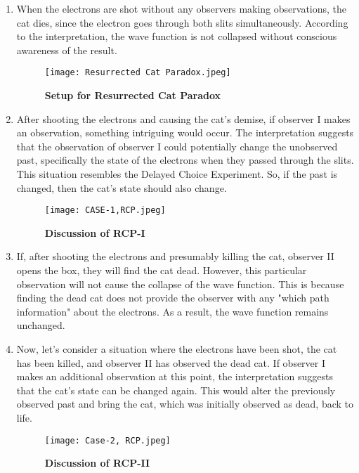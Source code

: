 \documentclass{article}
\begin{document}
\begin{enumerate}
    \item When the electrons are shot without any observers making observations, the cat dies, since the electron goes through both slits simultaneously. According to the interpretation, the wave function is not collapsed without conscious awareness of the result.


\begin{figure}[h]
    \centering 
    \texttt{[image: Resurrected Cat Paradox.jpeg]}
    \caption{\textbf{Setup for Resurrected Cat Paradox}}
    \label{Setup for Resurrected Cat Paradox}
\end{figure}



\item  After shooting the electrons and causing the cat's demise, if observer I makes an observation, something intriguing would occur. The interpretation suggests that the observation of observer I could potentially change the unobserved past, specifically the state of the electrons when they passed through the slits. This situation resembles the Delayed Choice Experiment. So, if the past is changed, then the cat's state should also change.


\begin{figure}[h]
\centering
     \texttt{[image: CASE-1,RCP.jpeg]}
      \caption{\textbf{Discussion of RCP-I}}
       \label{}
\end{figure}

\item If, after shooting the electrons and presumably killing the cat, observer II opens the box, they will find the cat dead. However, this particular observation will not cause the collapse of the wave function. This is because finding the dead cat does not provide the observer with any "which path information" about the electrons. As a result, the wave function remains unchanged.

\item Now, let's consider a situation where the electrons have been shot, the cat has been killed, and observer II has observed the dead cat. If observer I makes an additional observation at this point, the interpretation suggests that the cat's state can be changed again. This would alter the previously observed past and bring the cat, which was initially observed as dead, back to life.

\begin{figure}[h]
\centering
     \texttt{[image: Case-2, RCP.jpeg]}
      \caption{\textbf{Discussion of RCP-II}}
       \label{fig:Wavefn}
\end{figure}
\end{enumerate}
\end{document}
